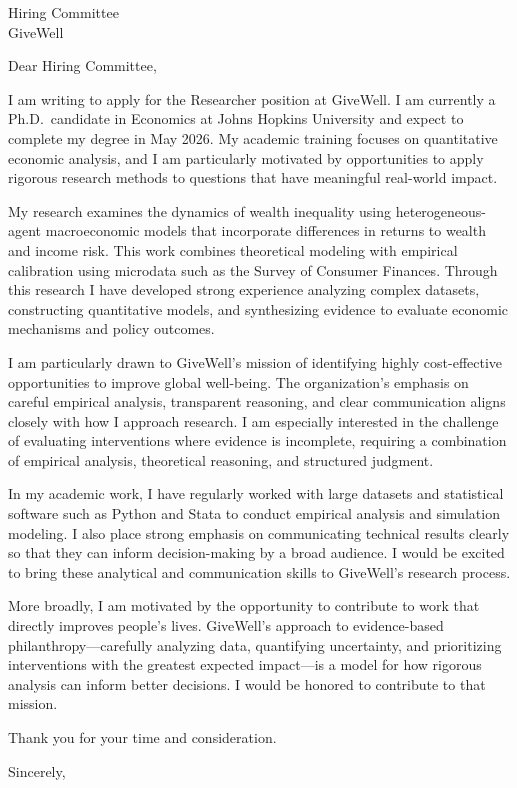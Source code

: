 \documentclass[11pt]{letter}
\begin{document}
\begin{letter}{Hiring Committee \\
GiveWell}

\opening{Dear Hiring Committee,}

I am writing to apply for the Researcher position at GiveWell. I am currently a Ph.D.\ candidate in Economics at Johns Hopkins University and expect to complete my degree in May 2026. My academic training focuses on quantitative economic analysis, and I am particularly motivated by opportunities to apply rigorous research methods to questions that have meaningful real-world impact.

My research examines the dynamics of wealth inequality using heterogeneous-agent macroeconomic models that incorporate differences in returns to wealth and income risk. This work combines theoretical modeling with empirical calibration using microdata such as the Survey of Consumer Finances. Through this research I have developed strong experience analyzing complex datasets, constructing quantitative models, and synthesizing evidence to evaluate economic mechanisms and policy outcomes.

I am particularly drawn to GiveWell’s mission of identifying highly cost-effective opportunities to improve global well-being. The organization’s emphasis on careful empirical analysis, transparent reasoning, and clear communication aligns closely with how I approach research. I am especially interested in the challenge of evaluating interventions where evidence is incomplete, requiring a combination of empirical analysis, theoretical reasoning, and structured judgment.

In my academic work, I have regularly worked with large datasets and statistical software such as Python and Stata to conduct empirical analysis and simulation modeling. I also place strong emphasis on communicating technical results clearly so that they can inform decision-making by a broad audience. I would be excited to bring these analytical and communication skills to GiveWell’s research process.

More broadly, I am motivated by the opportunity to contribute to work that directly improves people’s lives. GiveWell’s approach to evidence-based philanthropy—carefully analyzing data, quantifying uncertainty, and prioritizing interventions with the greatest expected impact—is a model for how rigorous analysis can inform better decisions. I would be honored to contribute to that mission.

Thank you for your time and consideration.

\closing{Sincerely,}

\end{letter}
\end{document}
